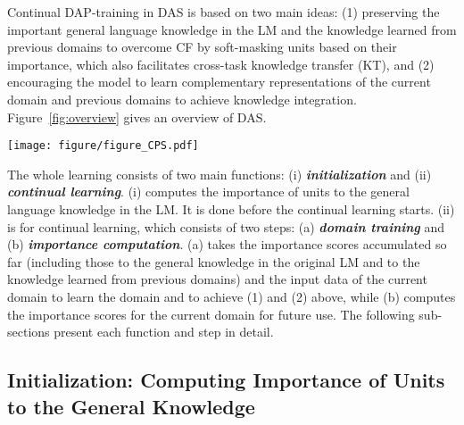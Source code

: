\documentclass{article} \usepackage{iclr2023_conference,times}
\begin{document}
Continual DAP-training in DAS is based on two main ideas: (1) preserving the important general language knowledge in the LM and the knowledge learned from previous domains to overcome CF by soft-masking units based on their importance, which also facilitates cross-task knowledge transfer (KT), and (2) encouraging the model to learn complementary representations of the current domain and previous domains to achieve knowledge integration.
Figure~\ref{fig:overview} gives an overview of DAS. 

\begin{figure*}[t!]
\centering
\texttt{[image: figure/figure\_CPS.pdf]}
 \vspace{-2mm}
\caption{
{\color{black}Illustration of DAS. {\color{black}The red cross indicates that the gradient is not used to update the Transformer but only to compute importance.} 
(A) \textbf{Initialization} (Sec.~\ref{sec:initialization}) computes the importance of units 
for the general knowledge in the LM. (B) \textbf{Domain Training} (Sec.~\ref{sec:training}) trains a new domain using the importance scores as soft-masks and contrasts the previously learned knowledge
and the full knowledge.
(C) \textbf{Importance Computation} (Sec.~\ref{sec:after_training}) computes the importance of the units for the current domain.
}
}
\label{fig:overview}
\vspace{-4mm}
\end{figure*}

{The whole learning consists of two main functions: (i) \textbf{\textit{initialization}} and (ii) \textbf{\textit{continual learning}}. (i) computes the importance of units to the general language knowledge in the LM. It is done before the continual learning starts. (ii) is for continual learning, which consists of two steps: (a) \textbf{\textit{domain training}} and (b) \textbf{\textit{importance computation}}. (a) takes the importance scores accumulated so far (including those to the general knowledge in the original LM and to the knowledge learned from previous domains) and the input data of the current domain to learn the domain and to achieve (1) and (2) above, while (b) computes the importance scores for the current domain for future use. The following sub-sections present each function and step in detail.
}



\subsection{Initialization: Computing Importance of Units to the General Knowledge}
\label{sec:initialization}
\end{document}
